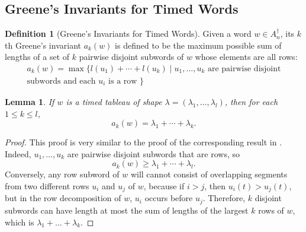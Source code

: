 \documentclass[10pt]{amsproc}
\newtheorem{lemma}[theorem]{Lemma}
\theoremstyle{definition}
\newtheorem{definition}[theorem]{Definition}
\theoremstyle{remark}
\begin{document}
\subsection{Greene's Invariants for Timed Words}
\label{sec:timed-greene-invar}
\begin{definition}[Greene's Invariants for Timed Words]
  \label{definition:timed-Greene-invars}
  Given a word $w\in A_n^\dagger$, its $k$th Greene's invariant $a_k(w)$ is defined to be the maximum possible sum of lengths of a set of $k$ pairwise disjoint subwords of $w$ whose elements are all rows:
  \begin{multline*}
    a_k(w) = \max\{l(u_1)+\dotsb+l(u_k)\mid u_1,\dotsc,u_k \text{ are pairwise disjoint}\\ \text{subwords and each $u_i$ is a row }\}
  \end{multline*}
\end{definition}
\begin{lemma}
  \label{lemma:tableau-shape-greene}
  If $w$ is a timed tableau of shape $\lambda=(\lambda_1,\dotsc,\lambda_l)$, then for each $1\leq k\leq l$,
  \begin{displaymath}
    a_k(w) = \lambda_1+\dotsb + \lambda_k.
  \end{displaymath}
\end{lemma}
\begin{proof}
  This proof is very similar to the proof of the corresponding result in \cite{Lascoux}.
  Indeed, $u_1,\dotsc,u_k$ are pairwise disjoint subwords that are rows, so
  \begin{displaymath}
    a_k(w) \geq \lambda_1+\dotsb + \lambda_l.
  \end{displaymath}
  Conversely, any row subword of $w$ will cannot consist of overlapping segments from two different rows $u_i$ and $u_j$ of $w$, because if $i>j$, then $u_i(t)>u_j(t)$, but in the row decomposition of $w$, $u_i$ occurs before $u_j$.
  Therefore, $k$ disjoint subwords can have length at most the sum of lengths of the largest $k$ rows of $w$, which is $\lambda_1+\dotsc+\lambda_k$.
\end{proof}
\end{document}
